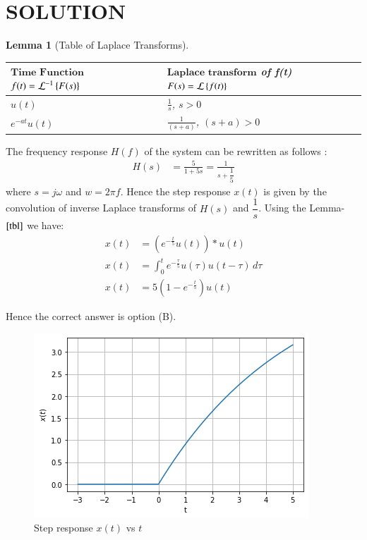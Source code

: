 \documentclass[journal,12pt,twocolumn]{IEEEtran}
\newtheorem{lemma}[theorem]{Lemma}
\begin{document}
\section{SOLUTION}
\begin{lemma}[Table of Laplace Transforms]\label{tbl}
\begin{center}
\begin{tabular}{ |m{3cm}|m{}| } 
 \hline
 $\textbf{Time Function}$ $f(t)=\mathcal{L}^{-1}\left\{F(s)\right\}$ & $\textbf{Laplace transform}$ of f(t) $F(s)=\mathcal{L}\left\{f(t)\right\}$ \\ 
 \hline
 $u(t)$ & $\frac{1}{s}$, $s>0$ \\ 
 \hline
 $e^{-at}u(t)$ & $\frac{1}{(s+a)}$, $(s+a)>0$\\
 \hline
\end{tabular}
\end{center}
\end{lemma}
The frequency response $H(f)$ of the system can be rewritten as follows :
\begin{align}
H(s) &= \frac{5}{1+5s} = \frac{1}{s + \dfrac{1}{5}}\label{eq:1}
\end{align}
where $s = j\omega$ and $w = 2\pi f$. Hence the step response $x(t)$ is given by the convolution of inverse Laplace transforms of $H(s)$ and $\dfrac{1}{s}$. Using the Lemma-$\ref{tbl}$ we have:
\begin{align}
x(t) &= (e^{-\frac{t}{5}}u(t))*u(t)\\
x(t) &= {\int_{0}^{t}e^{-\frac{\tau}{5}}u(\tau)u(t-\tau)\, d\tau}\\
x(t) &= 5(1-e^{-\frac{t}{5}})u(t)
\end{align}

Hence the correct answer is option (B).

\begin{figure}[!ht]
    \centering
    \includegraphics[width=\columnwidth] {Gate_Assignment_2_Fig_1.png}
    \caption{Step response $x(t)$ vs $t$}
    \label{Step response x(t)}
\end{figure}
\end{document}
